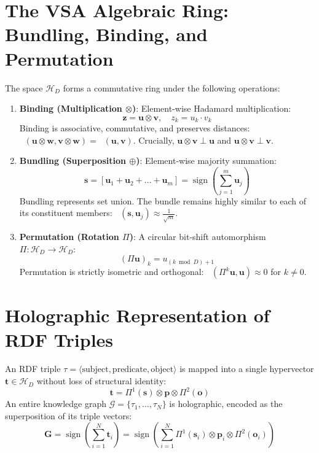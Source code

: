 \documentclass[12pt,oneside,a4paper]{book}
\theoremstyle{definition}
\theoremstyle{plain}
\theoremstyle{remark}
\DeclareMathOperator{\sign}{sign}
\DeclareMathOperator{\simcos}{sim_{\cos}}
\begin{document}
\section{The VSA Algebraic Ring: Bundling, Binding, and Permutation}
The space $\mathcal{H}_D$ forms a commutative ring under the following operations:
\begin{enumerate}
    \item \textbf{Binding (Multiplication $\otimes$)}: Element-wise Hadamard multiplication:
    \begin{equation}
        \mathbf{z} = \mathbf{u} \otimes \mathbf{v}, \quad z_k = u_k \cdot v_k
    \end{equation}
    Binding is associative, commutative, and preserves distances: $\simcos(\mathbf{u} \otimes \mathbf{w}, \mathbf{v} \otimes \mathbf{w}) = \simcos(\mathbf{u}, \mathbf{v})$. Crucially, $\mathbf{u} \otimes \mathbf{v} \perp \mathbf{u}$ and $\mathbf{u} \otimes \mathbf{v} \perp \mathbf{v}$.
    
    \item \textbf{Bundling (Superposition $\oplus$)}: Element-wise majority summation:
    \begin{equation}
        \mathbf{s} = [\mathbf{u}_1 + \mathbf{u}_2 + \dots + \mathbf{u}_m] = \sign\left(\sum_{j=1}^m \mathbf{u}_j\right)
    \end{equation}
    Bundling represents set union. The bundle remains highly similar to each of its constituent members: $\simcos(\mathbf{s}, \mathbf{u}_j) \approx \frac{1}{\sqrt{m}}$.
    
    \item \textbf{Permutation (Rotation $\Pi$)}: A circular bit-shift automorphism $\Pi: \mathcal{H}_D \to \mathcal{H}_D$:
    \begin{equation}
        (\Pi \mathbf{u})_k = u_{(k \bmod D) + 1}
    \end{equation}
    Permutation is strictly isometric and orthogonal: $\simcos(\Pi^k \mathbf{u}, \mathbf{u}) \approx 0$ for $k \ne 0$.
\end{enumerate}

\section{Holographic Representation of RDF Triples}
An RDF triple $\tau = \langle \text{subject}, \text{predicate}, \text{object} \rangle$ is mapped into a single hypervector $\mathbf{t} \in \mathcal{H}_D$ without loss of structural identity:
\begin{equation}
    \mathbf{t} = \Pi^1(\mathbf{s}) \otimes \mathbf{p} \otimes \Pi^2(\mathbf{o})
\end{equation}
An entire knowledge graph $\mathcal{G} = \{\tau_1, \dots, \tau_N\}$ is holographic, encoded as the superposition of its triple vectors:
\begin{equation}
    \mathbf{G} = \sign\left( \sum_{i=1}^N \mathbf{t}_i \right) = \sign\left( \sum_{i=1}^N \Pi^1(\mathbf{s}_i) \otimes \mathbf{p}_i \otimes \Pi^2(\mathbf{o}_i) \right)
\end{equation}
\end{document}
